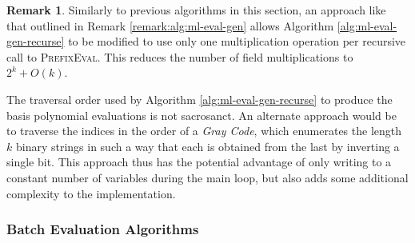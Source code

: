 \documentclass[12pt]{article}
\theoremstyle{plain}
\newcounter{documentcounter}
\newtheorem{theorem}[documentcounter]{Theorem}
\theoremstyle{definition}
\newtheorem{remark}[documentcounter]{Remark}
\newcommand{\defn}[1]{\textbf{#1}}
\newcommand{\defeq}{\coloneqq}                %
\newcommand{\FF}{\mathbb{F}}                  %
\newcommand*{\fn}[1]{\textsc{{#1}}}
\renewcommand*{\vec}[1]{{\mathbf{#1}}}
\begin{document}
\begin{remark}
  Similarly to previous algorithms in this section, an approach like that outlined in Remark \ref{remark:alg:ml-eval-gen} allows Algorithm \ref{alg:ml-eval-gen-recurse} to be modified to use only one multiplication operation per recursive call to \fn{PrefixEval}.  This reduces the number of field multiplications to $2^k + O(k)$.

  The traversal order used by Algorithm \ref{alg:ml-eval-gen-recurse} to produce the basis polynomial evaluations is not sacrosanct.  An alternate approach would be to traverse the indices in the order of a \emph{Gray Code}, which enumerates the length $k$ binary strings in such a way that each is obtained from the last by inverting a single bit.  This approach thus has the potential advantage of only writing to a constant number of variables during the main loop, but also adds some additional complexity to the implementation.
\end{remark}


\subsubsection{Batch Evaluation Algorithms}







\end{document}
